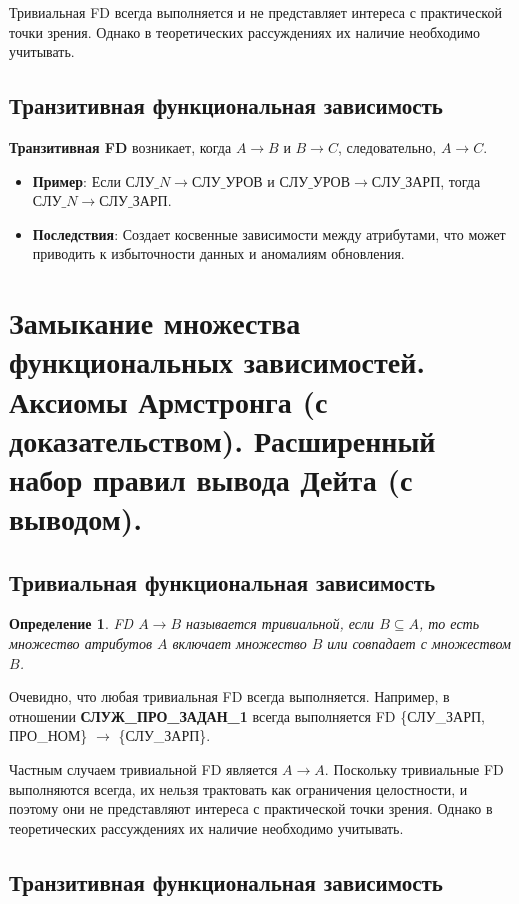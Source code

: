 \documentclass[a4paper,12pt]{article}
\newtheorem{definition}{Определение}
\begin{document}
Тривиальная FD всегда выполняется и не представляет интереса с практической точки зрения. Однако в теоретических рассуждениях их наличие необходимо учитывать.

\subsection{Транзитивная функциональная зависимость}

\textbf{Транзитивная FD} возникает, когда $A \rightarrow B$ и $B \rightarrow C$, следовательно, $A \rightarrow C$.

\begin{itemize}
    \item \textbf{Пример}: Если $СЛУ\_N \rightarrow СЛУ\_УРОВ$ и $СЛУ\_УРОВ \rightarrow СЛУ\_ЗАРП$, тогда $СЛУ\_N \rightarrow СЛУ\_ЗАРП$.
    \item \textbf{Последствия}: Создает косвенные зависимости между атрибутами, что может приводить к избыточности данных и аномалиям обновления.
\end{itemize}

\section{Замыкание множества функциональных зависимостей. Аксиомы Армстронга (с доказательством). Расширенный набор правил вывода Дейта (с выводом).}

\subsection{Тривиальная функциональная зависимость}

\begin{definition}
    FD $A \rightarrow B$ называется тривиальной, если $B \subseteq A$, то есть множество атрибутов $A$ включает множество $B$ или совпадает с множеством $B$.
\end{definition}

Очевидно, что любая тривиальная FD всегда выполняется. Например, в отношении \textbf{СЛУЖ\_ПРО\_ЗАДАН\_1} всегда выполняется FD \{СЛУ\_ЗАРП, ПРО\_НОМ\} $\rightarrow$ \{СЛУ\_ЗАРП\}.

Частным случаем тривиальной FD является $A \rightarrow A$. Поскольку тривиальные FD выполняются всегда, их нельзя трактовать как ограничения целостности, и поэтому они не представляют интереса с практической точки зрения. Однако в теоретических рассуждениях их наличие необходимо учитывать.

\subsection{Транзитивная функциональная зависимость}
\end{document}
